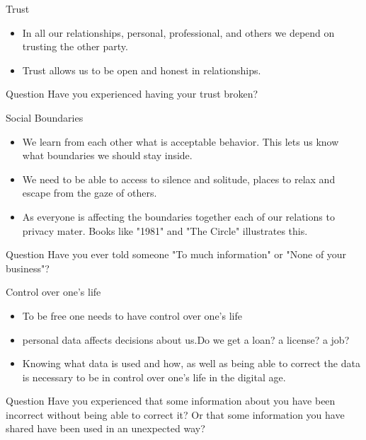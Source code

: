 \documentclass{beamer}
\begin{document}
\begin{frame}{Trust}
\begin{itemize}
  \item In all our relationships, personal, professional, and others we depend on trusting the other party.
  \item Trust allows us to be open and honest in relationships.
\end{itemize}
\begin{block}{Question}
Have you experienced having your trust broken?
\end{block}
\end{frame}


\begin{frame}{Social Boundaries}
\begin{itemize}
  \item We learn from each other what is acceptable behavior. This lets us know what boundaries we should stay inside.
  \item We need to be able to access to silence and solitude, places to relax and escape from the gaze of others.
  \item As everyone is affecting the boundaries together each of our relations to privacy mater. Books like "1981" and "The Circle" illustrates this.
\end{itemize}
\begin{block}{Question}
Have you ever told someone "To much information" or "None of your business"?
\end{block}
\end{frame}





\begin{frame}{Control over one's life}
\begin{itemize}
  \item To be free one needs to have control over one's life
  \item personal data affects decisions about us.Do we get a loan? a license? a job?
  \item Knowing what data is used and how, as well as being able to correct the data is necessary to be in control over one's life in the digital age.
\end{itemize}
\begin{block}{Question}
Have you experienced that some information about you have been incorrect without being able to correct it? Or that some information you have shared have been used in an unexpected way?
\end{block}
\end{frame}
\end{document}
